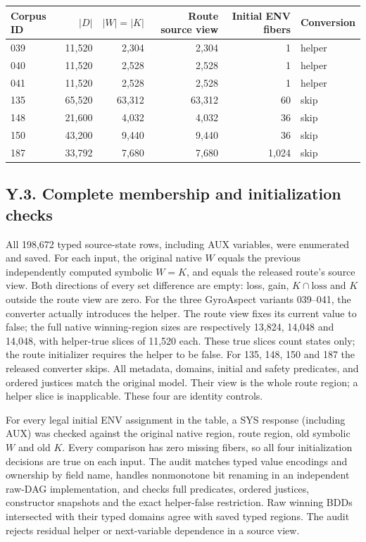 \begin{center}\small
\begin{tabular}{@{}lrrrrl@{}}\toprule
Corpus ID & $|D|$ & $|W|=|K|$ & Route source view & Initial ENV fibers & Conversion\\\midrule
039 & 11,520 & 2,304 & 2,304 & 1 & helper\\
040 & 11,520 & 2,528 & 2,528 & 1 & helper\\
041 & 11,520 & 2,528 & 2,528 & 1 & helper\\
135 & 65,520 & 63,312 & 63,312 & 60 & skip\\
148 & 21,600 & 4,032 & 4,032 & 36 & skip\\
150 & 43,200 & 9,440 & 9,440 & 36 & skip\\
187 & 33,792 & 7,680 & 7,680 & 1,024 & skip\\\bottomrule
\end{tabular}
\end{center}

\subsection*{Y.3. Complete membership and initialization checks}
All 198,672 typed source-state rows, including AUX variables, were
enumerated and saved. For each input, the original native $W$ equals the
previous independently computed symbolic $W=K$, and equals the released
route's source view. Both directions of every set difference are empty:
loss, gain, $K\cap\mathrm{loss}$ and $K$ outside the route view are zero.
For the three GyroAspect variants 039--041, the converter actually
introduces the helper. The route view fixes its current value to false;
the full native winning-region sizes are respectively 13,824, 14,048 and
14,048, with helper-true slices of 11,520 each. These true slices count
states only; the route initializer requires the helper to be false.
For 135, 148, 150 and 187 the released converter skips. All metadata,
domains, initial and safety predicates, and ordered justices match the
original model. Their view is the whole route region; a helper slice is
inapplicable. These four are identity controls.

For every legal initial ENV assignment in the table, a SYS response
(including AUX) was checked against the original native region, route
region, old symbolic $W$ and old $K$. Every comparison has zero missing
fibers, so all four initialization decisions are true on each input.
The audit matches typed value encodings and ownership by field name,
handles nonmonotone bit renaming in an independent raw-DAG implementation,
and checks full predicates, ordered justices, constructor snapshots and
the exact helper-false restriction. Raw winning BDDs intersected with
their typed domains agree with saved typed regions. The audit rejects
residual helper or next-variable dependence in a source view.

